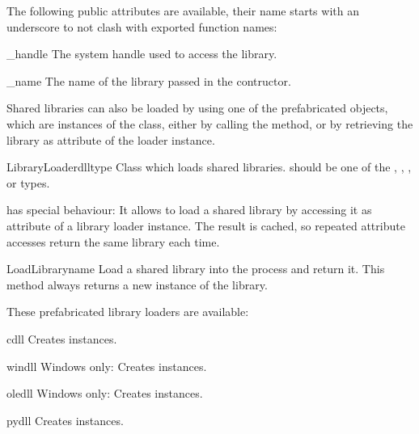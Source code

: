 The following public attributes are available, their name starts with
an underscore to not clash with exported function names:

\begin{memberdesc}{_handle}
The system handle used to access the library.
\end{memberdesc}

\begin{memberdesc}{_name}
The name of the library passed in the contructor.
\end{memberdesc}

Shared libraries can also be loaded by using one of the prefabricated
objects, which are instances of the  class, either by
calling the  method, or by retrieving the library as
attribute of the loader instance.

\begin{classdesc}{LibraryLoader}{dlltype}
Class which loads shared libraries.   should be one
of the , , , or  types.

 has special behaviour: It allows to load a shared
library by accessing it as attribute of a library loader
instance.  The result is cached, so repeated attribute accesses
return the same library each time.
\end{classdesc}

\begin{methoddesc}{LoadLibrary}{name}
Load a shared library into the process and return it.  This method
always returns a new instance of the library.
\end{methoddesc}

These prefabricated library loaders are available:

\begin{datadescni}{cdll}
Creates  instances.
\end{datadescni}

\begin{datadescni}{windll}
Windows only: Creates  instances.
\end{datadescni}

\begin{datadescni}{oledll}
Windows only: Creates  instances.
\end{datadescni}

\begin{datadescni}{pydll}
Creates  instances.
\end{datadescni}

